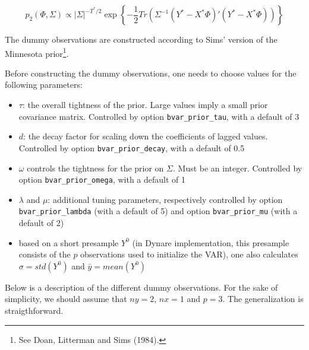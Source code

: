 \documentclass[10pt,a4paper]{article}
\begin{document}
$$p_2(\Phi, \Sigma) \propto |\Sigma|^{-T^*/2} \exp\left\{-\frac{1}{2}Tr(\Sigma^{-1}(Y^*-X^*\Phi)'(Y^*-X^*\Phi))\right\}$$

The dummy observations are constructed according to Sims' version of the Minnesota prior\footnote{See Doan, Litterman and Sims (1984).}.

Before constructing the dummy observations, one needs to choose values for the following parameters:
\begin{itemize}
\item $\tau$: the overall tightness of the prior. Large values imply a small prior covariance matrix. Controlled by option \texttt{bvar\_prior\_tau}, with a default of 3
\item $d$: the decay factor for scaling down the coefficients of lagged values. Controlled by option \texttt{bvar\_prior\_decay}, with a default of 0.5
\item $\omega$ controls the tightness for the prior on $\Sigma$. Must be an integer. Controlled by option \texttt{bvar\_prior\_omega}, with a default of 1
\item $\lambda$ and $\mu$: additional tuning parameters, respectively controlled by option \texttt{bvar\_prior\_lambda} (with a default of 5) and option \texttt{bvar\_prior\_mu} (with a default of 2)
\item based on a short presample $Y^0$ (in Dynare implementation, this presample consists of the $p$ observations used to initialize the VAR), one also calculates $\sigma = std(Y^0)$ and $\bar{y} = mean(Y^0)$
\end{itemize}

Below is a description of the different dummy observations. For the sake of simplicity, we should assume that $ny = 2$, $nx = 1$ and $p = 3$. The generalization is straigthforward.
\end{document}
